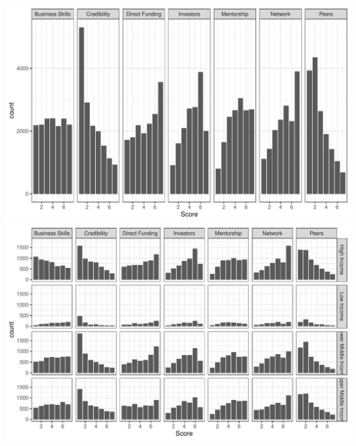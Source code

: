 \documentclass[
  english,
  man]{apa6}
\begin{document}
\includegraphics{Manuscript_files/figure-latex/unnamed-chunk-7-1.pdf} \includegraphics{Manuscript_files/figure-latex/unnamed-chunk-7-2.pdf}
\end{document}
